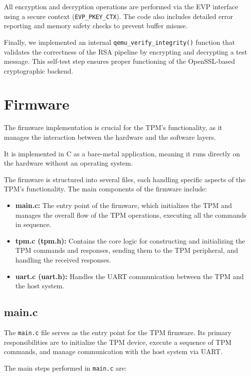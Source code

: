         All encryption and decryption operations are performed via the EVP interface using a secure context (\texttt{EVP\_PKEY\_CTX}). 
        The code also includes detailed error reporting and memory safety checks to prevent buffer misuse.

        Finally, we implemented an internal \texttt{qemu\_verify\_integrity()} function that validates the correctness of the RSA pipeline by encrypting and decrypting a test message. 
        This self-test step ensures proper functioning of the OpenSSL-based cryptographic backend.


\section{Firmware}
The firmware implementation is crucial for the TPM's 
functionality, as it manages the interaction between 
the hardware and the software layers. 

It is implemented in C as a bare-metal application, 
meaning it runs directly on the hardware without an operating system. 

The firmware is structured into several files, each handling specific aspects 
of the TPM's
functionality. The main components of the firmware include:
\begin{itemize}
    \item \textbf{main.c:} The entry point of the firmware,
    which initializes the TPM and manages the overall flow of the TPM operations,
    executing all the commands in sequence.
    \item \textbf{tpm.c (tpm.h):} Contains the core logic for
    constructing and initializing the TPM commands and responses,
    sending them to the TPM peripheral, and handling the 
    received responses.
    \item \textbf{uart.c (uart.h):} Handles the UART communication
    between the TPM and the host system.
\end{itemize}


\subsection{main.c}

The \texttt{main.c} file serves as the entry point for 
the TPM firmware. Its primary responsibilities are to 
initialize the TPM device, execute a sequence of TPM 
commands, and manage communication with the host system 
via UART. 

The main steps performed in \texttt{main.c} are:

